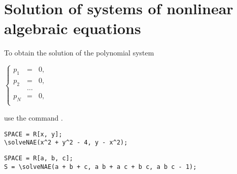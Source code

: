 \section{Solution of systems of nonlinear algebraic equations}

To obtain the solution of the polynomial system

$\left\{\begin{array}{rcl} p_{1} & = & 0,\\ p_{2} & = & 0,\\ & \ldots\\ p_{N} & = & 0,\\ \end{array} \right. $

use the command . 

\begin{verbatim}
SPACE = R[x, y];
\solveNAE(x^2 + y^2 - 4, y - x^2);
\end{verbatim}

\begin{verbatim}
SPACE = R[a, b, c];
S = \solveNAE(a + b + c, a b + a c + b c, a b c - 1);
\end{verbatim}

